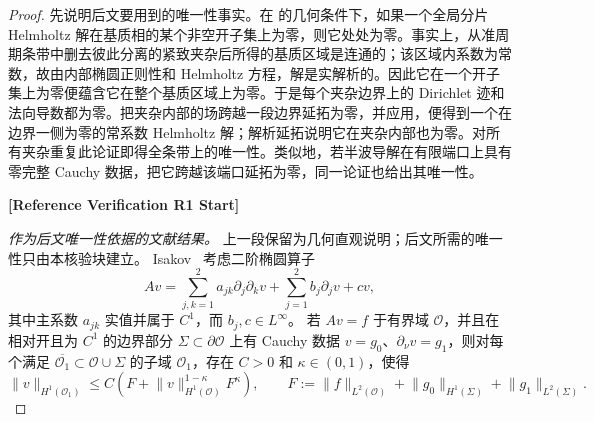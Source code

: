 \begin{proof}
先说明后文要用到的唯一性事实。在 的几何条件下，如果一个全局分片 Helmholtz 解在基质相的某个非空开子集上为零，则它处处为零。事实上，从准周期条带中删去彼此分离的紧致夹杂后所得的基质区域是连通的；该区域内系数为常数，故由内部椭圆正则性和 Helmholtz 方程，解是实解析的。因此它在一个开子集上为零便蕴含它在整个基质区域上为零。于是每个夹杂边界上的 Dirichlet 迹和法向导数都为零。把夹杂内部的场跨越一段边界延拓为零，并应用，便得到一个在边界一侧为零的常系数 Helmholtz 解；解析延拓说明它在夹杂内部也为零。对所有夹杂重复此论证即得全条带上的唯一性。类似地，若半波导解在有限端口上具有零完整 Cauchy 数据，把它跨越该端口延拓为零，同一论证也给出其唯一性。

\par\smallskip
\begingroup
\color{green!35!black}
\noindent\textbf{[Reference Verification R1 Start]}

\emph{作为后文唯一性依据的文献结果。}
上一段保留为几何直观说明；后文所需的唯一性只由本核验块建立。
Isakov~\cite[Theorem~3.3.1, p.~65]{Isakov2017} 考虑二阶椭圆算子
\[
  Av=\sum_{j,k=1}^2 a_{jk}\partial_j\partial_kv
      +\sum_{j=1}^2 b_j\partial_jv+cv,
\]
其中主系数 $a_{jk}$ 实值并属于 $C^1$，而 $b_j,c\in L^\infty$。
若 $Av=f$ 于有界域 $\mathcal O$，并且在相对开且为 $C^1$ 的边界部分
$\Sigma\subset\partial\mathcal O$ 上有 Cauchy 数据
$v=g_0$、$\partial_\nu v=g_1$，则对每个满足
$\overline{\mathcal O_1}\subset\mathcal O\cup\Sigma$ 的子域
$\mathcal O_1$，存在 $C>0$ 和 $\kappa\in(0,1)$，使得
\[
  \lVert v\rVert_{H^1(\mathcal O_1)}
  \leq C\left(
    F+\lVert v\rVert_{H^1(\mathcal O)}^{1-\kappa}F^\kappa
  \right),
  \qquad
  F:=\lVert f\rVert_{L^2(\mathcal O)}
     +\lVert g_0\rVert_{H^1(\Sigma)}
     +\lVert g_1\rVert_{L^2(\Sigma)}.
  \tag{R1.1}
\]


\end{proof}
